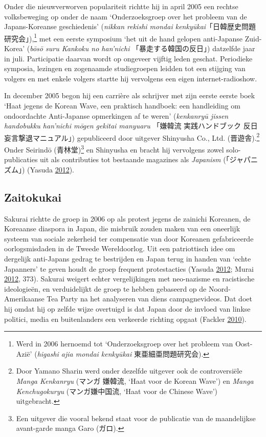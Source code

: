 \documentclass[10.5pt,dutch,]{article}
\begin{document}
Onder die nieuwverworven populariteit richtte hij in april 2005 een
rechtse volksbeweging op onder de naam `Onderzoeksgroep over het
probleem van de Japans-Koreanse geschiedenis' (\emph{nikkan rekishi
mondai kenkyūkai}「日韓歴史問題研究会」),\footnote{Werd in 2006 hernoemd
  tot `Onderzoeksgroep over het probleem van Oost-Azië' (\emph{higashi
  ajia mondai kenkyūkai} 東亜細亜問題研究会).} met een eerste symposium
`het uit de hand gelopen anti-Japanse Zuid-Korea' (\emph{bōsō suru
Kankoku no han'nichi} 「暴走する韓国の反日」) datzelfde jaar in juli.
Participatie daarvan wordt op ongeveer vijftig leden geschat. Periodieke
symposia, lezingen en zogenaamde studiegroepen leidden tot een stijging
van volgers en met enkele volgers startte hij vervolgens een eigen
internet-radioshow.

In december 2005 begon hij een carrière als schrijver met zijn eerste
eerste boek `Haat jegens de Korean Wave, een praktisch handboek: een
handleiding om ondoordachte Anti-Japanse opmerkingen af te weren'
(\emph{kenkanryū jissen handobukku han'nichi mōgen gekitai manyuaru}
「嫌韓流 実践ハンドブック 反日妄言撃退マニュアル」) gepubliceerd door
uitgever Shinyusha Co., Ltd. (晋遊舎).\footnote{Door Yamano Sharin werd
  onder dezelfde uitgever ook de controversiële \emph{Manga Kenkanryu}
  (マンガ 嫌韓流, `Haat voor de Korean Wave') en \emph{Manga
  Kenchugokuryu} (マンガ嫌中国流, `Haat voor de Chinese Wave')
  uitgebracht.} Onder Seirindō (青林堂)\footnote{Een uitgever die vooral
  bekend staat voor de publicatie van de maandelijkse avant-garde manga
  Garo (ガロ).} en Shinyusha en bracht hij vervolgens zowel
solo-publicaties uit als contributies tot bestaande magazines als
\emph{Japanism} (「ジャパニズム」) (Yasuda
\protect\hyperlink{ref-yasudaux5fnettoux5f2012}{2012}).

\subsection{Zaitokukai}\label{zaitokukai}

Sakurai richtte de groep in 2006 op als protest jegens de zainichi
Koreanen, de Koreaanse diaspora in Japan, die misbruik zouden maken van
een oneerlijk systeem van sociale zekerheid ter compensatie van door
Koreanen gefabriceerde oorlogsmisdaden in de Tweede Wereldoorlog. Uit
een patriottisch idee om dergelijk anti-Japans gedrag te bestrijden en
Japan terug in handen van `echte Japanners' te geven houdt de groep
frequent protestacties (Yasuda
\protect\hyperlink{ref-yasudaux5fnettoux5f2012}{2012}; Murai
\protect\hyperlink{ref-muraiux5fnetux5f2012}{2012}, 373). Sakurai
weigert echter vergelijkingen met neo-nazisme en racistische
ideologieën, en verduidelijkt de groep te hebben gebaseerd op de
Noord-Amerikaanse Tea Party na het analyseren van diens campagnevideos.
Dat doet hij omdat hij op zelfde wijze overtuigd is dat Japan door de
invloed van linkse politici, media en buitenlanders een verkeerde
richting opgaat (Fackler
\protect\hyperlink{ref-facklerux5fnewux5f2010}{2010}).
\end{document}
